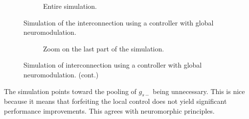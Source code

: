 \begin{figure}[!b]
    \centering
    \begin{subfigure}[t]{\textwidth}
        \centering
        \caption{Entire simulation.}
    \end{subfigure}
    \caption{Simulation of the interconnection using a controller with global neuromodulation.}
    \label{fig:hco_mod_global}
\end{figure}

\begin{figure}[!t]\ContinuedFloat
    \centering
    \begin{subfigure}[b]{\textwidth}
        \centering
        \caption{Zoom on the last part of the simulation.}
    \end{subfigure}
    \caption{Simulation of interconnection using a controller with global neuromodulation. (cont.)}
    \label{fig:hco_mod_global2}
\end{figure}

The simulation points toward the pooling of $g_{s-}$ being unnecessary.
This is nice because it means that forfeiting the local control does not yield significant performance improvements.
This agrees with neuromorphic principles.

